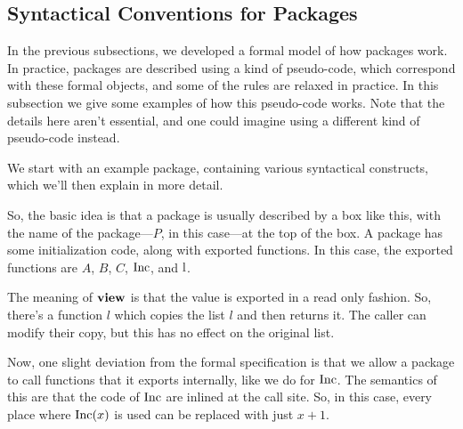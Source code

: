 \subsection{Syntactical Conventions for Packages}

In the previous subsections, we developed a formal model of
how packages work.
In practice, packages are described using a kind of pseudo-code,
which correspond with these formal objects, and some of the rules are relaxed
in practice.
In this subsection we give some examples of how this pseudo-code
works.
Note that the details here aren't essential, and one could imagine
using a different kind of pseudo-code instead.

We start with an example package, containing various syntactical constructs,
which we'll then explain in more detail.


So, the basic idea is that a package is usually described
by a box like this, with the name of the package---$P$, in this case---at
the top of the box.
A package has some initialization code,
along with exported functions.
In this case, the exported functions are $A$, $B$, $C$,
$\text{Inc}$, and $\text{l}$.

The meaning of $\textbf{view}$ is that the value is exported
in a read only fashion.
So, there's a function $l$ which copies the list $l$
and then returns it.
The caller can modify their copy, but this has no effect on the original
list.

Now, one slight deviation from the formal specification is that
we allow a package to call functions that it exports internally,
like we do for $\text{Inc}$.
The semantics of this are that the code of $\text{Inc}$ are inlined
at the call site.
So, in this case, every place where $\text{Inc}(x)$ is used
can be replaced with just $x + 1$.

